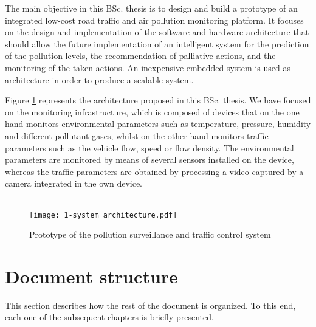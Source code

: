 The main objective in this \ac{BSc.} thesis is to design and build a prototype of an integrated low-cost road traffic and air pollution monitoring platform. It focuses on the design and implementation of the software and hardware architecture that should allow the future implementation of an intelligent system for the prediction of the pollution levels, the recommendation of palliative actions, and the monitoring of the taken actions. An inexpensive embedded system is used as architecture in order to produce a scalable system.

Figure \ref{fig:1-system_architecture} represents the architecture proposed in this \ac{BSc.} thesis. We have focused on the monitoring infrastructure, which is composed of devices that on the one hand monitors environmental parameters such as temperature, pressure, humidity and different pollutant gases, whilst on the other hand monitors traffic parameters such as the vehicle flow, speed or flow density. The environmental parameters are monitored by means of several sensors installed on the device, whereas the traffic parameters are obtained by processing a video captured by a camera integrated in the own device. \\ \\

\begin{figure}[!h]
	\begin{center}
		\texttt{[image: 1-system\_architecture.pdf]}	
		\caption{Prototype of the pollution surveillance and traffic control system}
		\label{fig:1-system_architecture}
	\end{center}
\end{figure}


\newpage
\section{Document structure}

This section describes how the rest of the document is organized. To this end, each one of the subsequent chapters is briefly presented.

